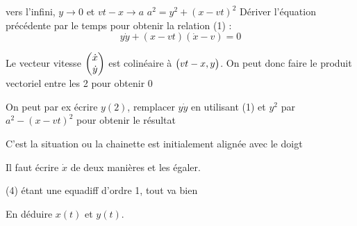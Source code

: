 \begin{solution}

\begin{questions}
    \question vers l'infini, $y\rightarrow 0$ et $vt-x \rightarrow a$
    \question $a^2 = y^2 + (x - vt)^2$
    \question Dériver l'équation précédente par le temps pour obtenir la relation (1) :
    $$ y\dot y  + (x-vt)(\dot x - v) = 0$$
    
    \question Le vecteur vitesse $\mqty( \dot x \\ \dot y)$ est colinéaire à $\mqty(vt - x, y)$. On peut donc faire le produit vectoriel entre les 2 pour obtenir 0 
    
    \question On peut par ex écrire $y (2)$, remplacer $y \dot y$ en utilisant (1) et $y^2$ par $a^2 - (x - vt)^2$ pour obtenir le résultat
    
    \question C'est la situation ou la chainette est initialement alignée avec le doigt
    
    \question Il faut écrire $\dot x$ de deux manières et les égaler.
    
    \question (4) étant une equadiff d'ordre 1, tout va bien
    
    \question En déduire $x(t)$ et $y(t)$.
\end{questions}
\end{solution}